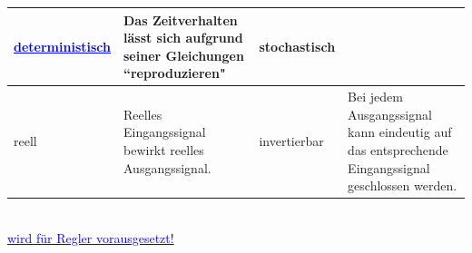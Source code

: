\begin{tabular}{|l|p{6.3cm}||l|p{6.3cm}|}
	        	
	        	\textcolor{blue}{\underline{deterministisch}}	&
	        	 Das Zeitverhalten lässt sich aufgrund seiner Gleichungen
	        	 ``reproduzieren"&
	        	stochastisch &		%
	        	\\
	        \hline
	        \hline
	        	reell&
	        	Reelles Eingangssignal bewirkt
	        	reelles Ausgangssignal.&
	        	
	        	invertierbar&
	        	Bei jedem Ausgangssignal kann eindeutig
	        	auf das entsprechende Eingangssignal
	        	geschlossen werden.\\
	        \hline
	        
	       \end{tabular}\\[1mm]
   				\textcolor{blue}{\underline{wird für Regler vorausgesetzt!}}
			
